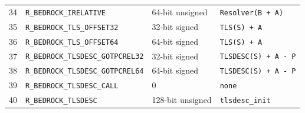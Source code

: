 \documentclass[10pt,twoside]{article}
\begin{document}
\begin{longtable}{@{}p{0.45in}p{2.15in}p{0.85in}p{2.05in}@{}}
34 & \texttt{R\_\allowbreak{}BEDROCK\_\allowbreak{}IRELATIVE} & 64-bit unsigned & \texttt{Resolver(B + A)}\\
35 & \texttt{R\_\allowbreak{}BEDROCK\_\allowbreak{}TLS\_\allowbreak{}OFFSET32} & 32-bit signed & \texttt{TLS(S) + A}\\
36 & \texttt{R\_\allowbreak{}BEDROCK\_\allowbreak{}TLS\_\allowbreak{}OFFSET64} & 64-bit signed & \texttt{TLS(S) + A}\\
37 & \texttt{R\_\allowbreak{}BEDROCK\_\allowbreak{}TLSDESC\_\allowbreak{}GOTPCREL32} & 32-bit signed & \texttt{TLSDESC(S) + A - P}\\
38 & \texttt{R\_\allowbreak{}BEDROCK\_\allowbreak{}TLSDESC\_\allowbreak{}GOTPCREL64} & 64-bit signed & \texttt{TLSDESC(S) + A - P}\\
39 & \texttt{R\_\allowbreak{}BEDROCK\_\allowbreak{}TLSDESC\_\allowbreak{}CALL} & 0 & \texttt{none}\\
40 & \texttt{R\_\allowbreak{}BEDROCK\_\allowbreak{}TLSDESC} & 128-bit unsigned & \texttt{tlsdesc\_\allowbreak{}init}\\
\bottomrule
\end{longtable}
\endgroup
\end{document}
